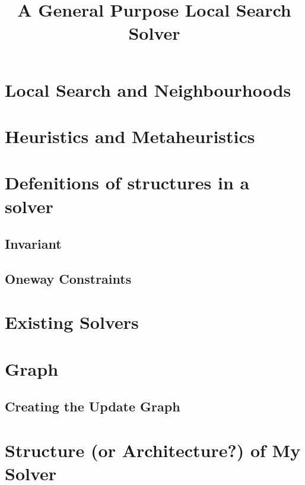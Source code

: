 \documentclass[a4paper,10pt]{article}
\title{A General Purpose Local Search Solver}
\begin{document}
\maketitle

\begin{abstract}

\end{abstract}

\section{Local Search and Neighbourhoods}
\section{Heuristics and Metaheuristics}

\section{Defenitions of structures in a solver}

\subsection{Invariant}

\subsection{Oneway Constraints}

\section{Existing Solvers}



\section{Graph}

\subsection{Creating the Update Graph} \label{updategraph}


\section{Structure (or Architecture?) of My Solver}

\end{document}
